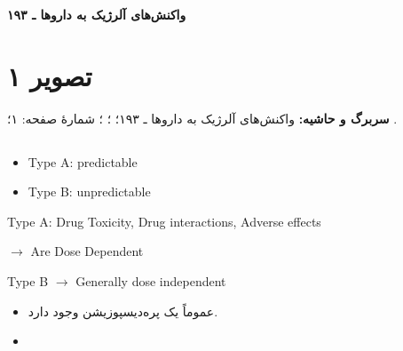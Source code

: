 \documentclass[12pt,a4paper]{article}
\begin{document}
\fi
\begingroup
\newcommand{\ADRrange}[2]{\lr{#1--#2}}
\newcommand{\ADRunclear}[1]{\textbf{[خوانش نامطمئن: #1]}}
\newcommand{\ADRblank}{\lr{(\hspace{1cm})}}
\newcommand{\ADRarrow}{\lr{\(\longleftarrow\)}}
\newcommand{\ADRpage}[1]{\clearpage\section*{تصویر #1}
  \textbf{سربرگ و حاشیه:} ۱۹۳ ـ؛ \lr{Subject:} (خالی)؛
  \lr{Date: / /}؛ شمارهٔ صفحه: #1؛ نشان پایین برگه: \lr{YASHA}.\par}

\begin{center}
  {\Large\bfseries واکنش‌های آلرژیک به داروها ـ ۱۹۳}\par
\end{center}

\section*{تصویر ۱}
\textbf{سربرگ و حاشیه:} واکنش‌های آلرژیک به داروها ـ ۱۹۳؛
؛ ؛ شمارهٔ صفحه: ۱؛ .

\subsection*{}
\begin{latin}
\begin{itemize}
  \item Type A: predictable
  \item Type B: unpredictable
\end{itemize}
\end{latin}

\begin{latin}
\noindent Type A: Drug Toxicity, Drug interactions, Adverse effects
\par\noindent\(\longrightarrow\) Are Dose Dependent
\par\medskip
\noindent Type B \(\longrightarrow\) Generally dose independent
\end{latin}
\begin{itemize}
  \item عموماً یک پره‌دیسپوزیشن وجود دارد.
  \item {}
\end{itemize}
\end{document}
